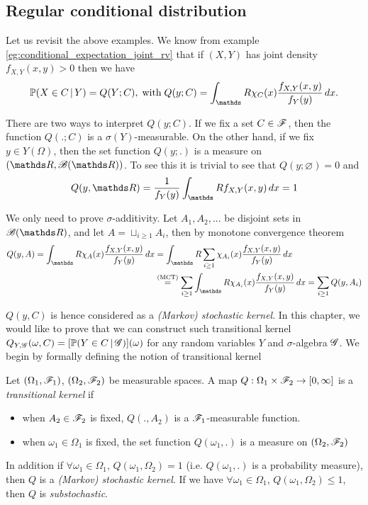 \subsection{Regular conditional distribution}
\begin{unexaminable}
Let us revisit the above examples. We know from example \ref{eg:conditional_expectation_joint_rv} that if $(X,Y)$ has joint density $f_{X,Y}(x,y) > 0$ then we have
\begin{equation}
    \p(X \in C \,|\, Y) = Q(Y;C), \; \text{with} \; Q(y;C) = \int_\R \chi_C(x) \frac{f_{X,Y}(x,y)}{f_Y(y)} \, dx.
\end{equation}

There are two ways to interpret $Q(y;C)$. If we fix a set $C \in \mathcal{F}$, then the function $Q(.;C)$ is a $\sigma(Y)$-measurable. On the other hand, if we fix $y \in Y(\Omega)$, then the set function $Q(y;.)$ is a measure on $(\R,\B(\R))$. To see this it is trivial to see that $Q(y;\varnothing) = 0$ and 
\begin{equation}
    Q(y,\R) = \frac{1}{f_Y(y)} \int_\R f_{X,Y}(x,y) \, dx = 1 
\end{equation}

We only need to prove $\sigma$-additivity. Let $A_1, A_2, ...$ be disjoint sets in $\B(\R)$, and let $A = \sqcup_{i\geq 1} A_i$, then by monotone convergence theorem
\begin{align*}
    Q(y,A) = \int_\R \chi_A(x) \frac{f_{X,Y}(x,y)}{f_Y(y)} \, dx 
    &= \int_\R \sum_{i\geq 1} \chi_{A_i}(x) \frac{f_{X,Y}(x,y)}{f_Y(y)} \, dx \\ &\overset{\text{(MCT)}}{=} \sum_{i\geq1} \int_\R \chi_{A_i}(x) \frac{f_{X,Y}(x,y)}{f_Y(y)} \, dx = \sum_{i\geq 1} Q(y,A_i)
\end{align*}

$Q(y,C)$ is hence considered as a \textit{(Markov) stochastic kernel}. In this chapter, we would like to prove that we can construct such transitional kernel $Q_{Y,\mathcal{G}}(\omega, C) = [\mathbb{P}(Y \in C \,|\, \mathcal{G})](\omega)$ for any random variables $Y$ and $\sigma$-algebra $\mathcal{G}$. We begin by formally defining the notion of transitional kernel

\begin{definition}
Let $(\Omega_1, \mathcal{F}_1)$, $(\Omega_2,\mathcal{F}_2)$ be measurable spaces. A map $Q:\Omega_1 \times \mathcal{F}_2 \to [0,\infty]$ is a \textit{transitional kernel} if
\begin{itemize}
    \item when $A_2 \in \mathcal{F}_2$ is fixed, $Q(.,A_2)$ is a $\mathcal{F}_1$-measurable function.
    \item when $\omega_1 \in \Omega_1$ is fixed, the set function $Q(\omega_1,.)$ is a measure on $(\Omega_2, \mathcal{F}_2)$
\end{itemize}
In addition if $\forall \omega_1 \in \Omega_1$, $Q(\omega_1, \Omega_2) = 1$ (i.e. $Q(\omega_1,.)$ is a probability measure), then $Q$ is a \textit{(Markov) stochastic kernel}. If we have $\forall \omega_1 \in \Omega_1$, $Q(\omega_1, \Omega_2) \leq 1$, then $Q$ is \textit{substochastic}.
\end{definition}


\end{unexaminable}
